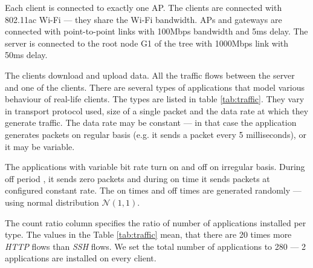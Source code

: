 Each client is connected to exactly one AP. The clients are connected with 802.11ac Wi-Fi --- they share the Wi-Fi bandwidth. APs and gateways are connected with point-to-point links with 100Mbps bandwidth and 5ms delay. The server is connected to the root node G1 of the tree with 1000Mbps link with 50ms delay.

The clients download and upload data. All the traffic flows between the server and one of the clients. There are several types of applications  that model various behaviour  of real-life  clients. The types are listed in table \ref{tab:traffic}. They vary in transport protocol used,  size of a single packet and the data rate at which they generate traffic. The data rate may be constant --- in that case the application generates packets on regular basis (e.g. it sends a packet every 5 milliseconds), or it may be variable.

The applications with variable bit rate turn on and off on irregular basis. During off period , it sends zero packets  and during on time  it sends packets at configured constant rate. The on times and off times  are generated randomly --- using normal distribution $\mathcal{N}(1,1)$. 

The count ratio column specifies the ratio of number of applications installed per type. The values in the Table \ref{tab:traffic} mean, that there are 20 times more \emph{HTTP} flows than \emph{SSH} flows. We set the total number of applications to 280 --- 2 applications are installed on every client. 


